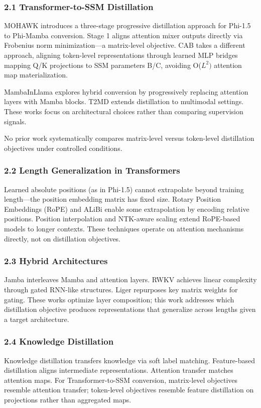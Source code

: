 
\subsubsection{2.1 Transformer-to-SSM Distillation}

MOHAWK introduces a three-stage progressive distillation approach for Phi-1.5 to Phi-Mamba conversion. Stage 1 aligns attention mixer outputs directly via Frobenius norm minimization---a matrix-level objective. CAB takes a different approach, aligning token-level representations through learned MLP bridges mapping Q/K projections to SSM parameters B/C, avoiding O($L^{2})$ attention map materialization.

MambaInLlama explores hybrid conversion by progressively replacing attention layers with Mamba blocks. T2MD extends distillation to multimodal settings. These works focus on architectural choices rather than comparing supervision signals.

No prior work systematically compares matrix-level versus token-level distillation objectives under controlled conditions.

\subsubsection{2.2 Length Generalization in Transformers}

Learned absolute positions (as in Phi-1.5) cannot extrapolate beyond training length---the position embedding matrix has fixed size. Rotary Position Embeddings (RoPE) and ALiBi enable some extrapolation by encoding relative positions. Position interpolation and NTK-aware scaling extend RoPE-based models to longer contexts. These techniques operate on attention mechanisms directly, not on distillation objectives.

\subsubsection{2.3 Hybrid Architectures}

Jamba interleaves Mamba and attention layers. RWKV achieves linear complexity through gated RNN-like structures. Liger repurposes key matrix weights for gating. These works optimize layer composition; this work addresses which distillation objective produces representations that generalize across lengths given a target architecture.

\subsubsection{2.4 Knowledge Distillation}

Knowledge distillation transfers knowledge via soft label matching. Feature-based distillation aligns intermediate representations. Attention transfer matches attention maps. For Transformer-to-SSM conversion, matrix-level objectives resemble attention transfer; token-level objectives resemble feature distillation on projections rather than aggregated maps.

